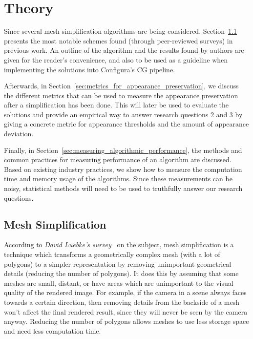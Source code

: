 
\chapter{Theory} \label{ch:theory}

Since several mesh simplification algorithms are being considered, Section~\ref{sec:mesh_simplification} presents the most notable schemes found (through peer-reviewed surveys) in previous work. An outline of the algorithm and the results found by authors are given for the reader's convenience, and also to be used as a guideline when implementing the solutions into Configura's CG pipeline.

Afterwards, in Section~\ref{sec:metrics_for_appearance_preservation}, we discuss the different metrics that can be used to measure the appearance preservation after a simplification has been done. This will later be used to evaluate the solutions and provide an empirical way to answer research questions 2 and 3 by giving a concrete metric for appearance thresholds and the amount of appearance deviation.

Finally, in Section~\ref{sec:measuring_algorithmic_performance}, the methods and common practices for measuring performance of an algorithm are discussed. Based on existing industry practices, we show how to measure the computation time and memory usage of the algorithms. Since these measurements can be noisy, statistical methods will need to be used to truthfully answer our research questions.

\section{Mesh Simplification} \label{sec:mesh_simplification}

According to \emph{David Luebke's survey}~\cite{luebke2001developer} on the subject, mesh simplification is a technique which transforms a geometrically complex mesh (with a lot of polygons) to a simpler representation by removing unimportant geometrical details (reducing the number of polygons). It does this by assuming that some meshes are small, distant, or have areas which are unimportant to the visual quality of the rendered image. For example, if the camera in a scene always faces towards a certain direction, then removing details from the backside of a mesh won't affect the final rendered result, since they will never be seen by the camera anyway. Reducing the number of polygons allows meshes to use less storage space and need less computation time.

